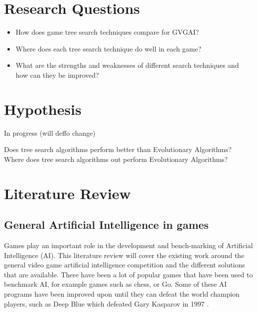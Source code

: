 \documentclass[journal]{IEEEtran}
\begin{document}



\section{Research Questions}

\begin{itemize}
    \item How does game tree search techniques compare for GVGAI? 
    \item Where does each tree search technique do well in each game? 
    \item What are the strengths and weaknesses of different search techniques and how can they be improved? 
\end{itemize}

\section{Hypothesis}
In progress (will deffo change) \par
Does tree search algorithms perform better than Evolutionary Algorithms?
Where does tree search algorithms out perform Evolutionary Algorithms?

\section{Literature Review}

	\subsection{General Artificial Intelligence in games}
		Games play an important role in the development and bench-marking of Artificial Intelligence (AI). This literature review will cover the existing work around the general video game artificial intelligence competition and the different solutions that are available.
		There have been a lot of popular games that have been used to benchmark AI, for example games such as chess, or Go. Some of these AI programs have been improved upon until they can defeat the world champion players, such as Deep Blue which defeated Gary Kasparov in 1997 \cite{DeepBlue, shannon1988programming, DeepBlueOverview}. 
		
\end{document}

